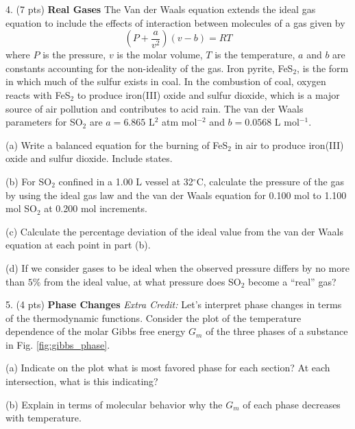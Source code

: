 \documentclass[11pt]{article}
\begin{document}
\pagebreak

4. (7 pts) \textbf{Real Gases} The Van der Waals equation extends the ideal gas equation to
include the effects of interaction between molecules of a gas given by
\begin{equation}
  (P+\frac{a}{v^2})(v - b) = RT
  \label{eqn:van_der}
\end{equation}
where $P$ is the pressure, $v$ is the molar volume, $T$ is the temperature, $a$ and $b$
are constants accounting for the non-ideality of the gas. Iron pyrite, FeS$_2$, is the
form in which much of the sulfur exists in coal. In the combustion of coal, oxygen reacts
with FeS$_2$ to produce iron(III) oxide and sulfur dioxide, which is a major source of air
pollution and contributes to acid rain. The van der Waals parameters for SO$_2$ are
$a = 6.865$ L$^2$ atm mol$^{-2}$ and $b = 0.0568$ L mol$^{-1}$.

(a) Write a balanced equation for the burning of FeS$_2$ in air to produce iron(III)
oxide and sulfur dioxide. Include states.

(b) For SO$_2$ confined in a 1.00 L vessel at 32$^\circ$C, calculate the pressure of the gas
by using the ideal gas law and the van der Waals equation for 0.100 mol to 1.100 mol SO$_2$ at
0.200 mol increments.

(c) Calculate the percentage deviation of the ideal value from the van der Waals equation at
each point in part (b).

(d) If we consider gases to be ideal when the observed pressure differs by no more than $5\%$
from the ideal value, at what pressure does SO$_2$ become a ``real'' gas?

\pagebreak



5. (4 pts) \textbf{Phase Changes} \textit{Extra Credit:} Let's interpret phase changes in terms
of the thermodynamic functions. Consider the plot of the temperature dependence of the molar
Gibbs free energy $G_m$ of the three phases of a substance in Fig. \ref{fig:gibbs_phase}.

(a) Indicate on the plot what is most favored phase for each section? At each intersection,
what is this indicating?

(b) Explain in terms of molecular behavior why the $G_m$ of each phase decreases with temperature.
\end{document}
